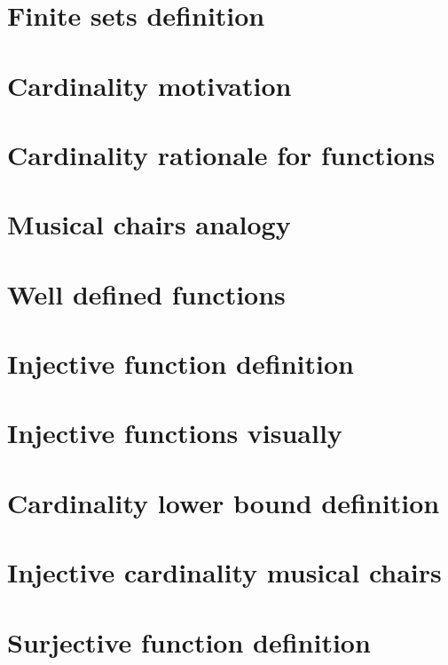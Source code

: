 \section*{Finite sets definition}

\vfill
\section*{Cardinality motivation}

\vfill
\section*{Cardinality rationale for functions}

\vfill
\section*{Musical chairs analogy}

\vfill
\section*{Well defined functions}

\vfill
\section*{Injective function definition}

\vfill
\section*{Injective functions visually}

\vfill
\section*{Cardinality lower bound definition}

\vfill
\section*{Injective cardinality musical chairs}

\vfill
\section*{Surjective function definition}

\vfill
